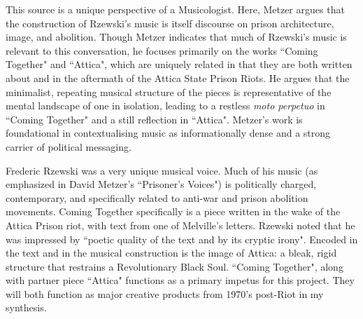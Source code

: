 \documentclass[14pt, letterpaper]{article}
\begin{document}
\clearpage


\begin{adjustwidth}{2ex}{0pt}

  This source is a unique perspective of a Musicologist. Here, Metzer 
  argues that the construction of Rzewski's music is itself discourse 
  on prison architecture, image, and abolition. Though Metzer indicates 
  that much of Rzewski's music is relevant to this conversation, he 
  focuses primarily on the works ``Coming Together" and ``Attica", which 
  are uniquely related in that they are both written about and in the 
  aftermath of the Attica State Prison Riots. He argues that the minimalist, 
  repeating musical structure of the pieces is representative of the mental 
  landscape of one in isolation, leading to a restless \textit{moto perpetuo}
  in ``Coming Together" and a still reflection in ``Attica". Metzer's work 
  is foundational in contextualising music as informationally dense and 
  a strong carrier of political messaging. 
  
\end{adjustwidth}

\clearpage


\begin{adjustwidth}{2.5ex}{0pt}

  Frederic Rzewski was a very unique musical voice. Much of his music 
  (as emphasized in David Metzer's ``Prisoner's Voices") is politically 
  charged, contemporary, and specifically related to anti-war and 
  prison abolition movements. Coming Together specifically is a piece 
  written in the wake of the Attica Prison riot, with text from one 
  of Melville's letters. Rzewski noted that he was impressed by 
  ``poetic quality of the text and by its cryptic irony". Encoded 
  in the text and in the musical construction is the image of Attica: 
  a bleak, rigid structure that restrains a Revolutionary Black Soul. 
  ``Coming Together", along with partner piece ``Attica" functions as 
  a primary impetus for this project. They will both function as major 
  creative products from 1970's post-Riot in my synthesis. 

\end{adjustwidth}

\clearpage

\end{document}

